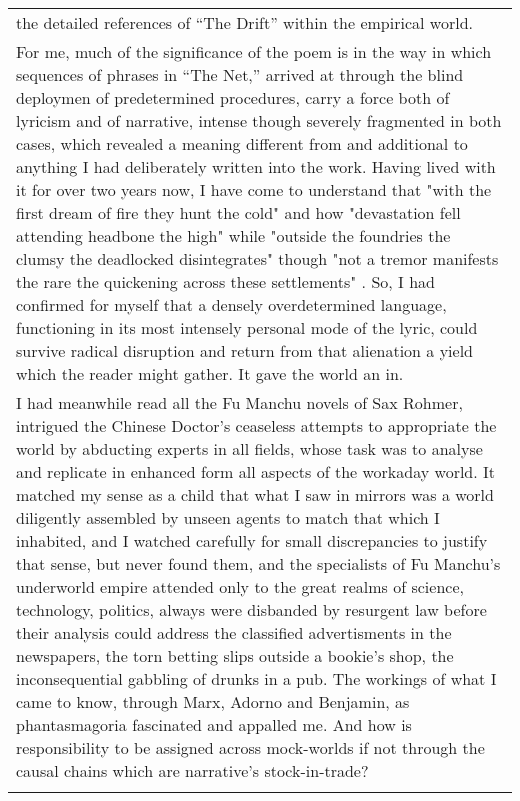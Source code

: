 \begin{longtable}[]{@{}l@{}}
\begin{minipage}[t]{0.97\columnwidth}
the detailed references of ``The Drift'' within the empirical
world.\strut
\end{minipage}\tabularnewline
\begin{minipage}[t]{0.97\columnwidth}\raggedright
For me, much of the significance of the poem is in the way in which
sequences of phrases in ``The Net,'' arrived at through the blind
deploymen of predetermined procedures, carry a force both of lyricism
and of narrative, intense though severely fragmented in both cases,
which revealed a meaning different from and additional to anything I had
deliberately written into the work. Having lived with it for over two
years now, I have come to understand that "with the first dream of fire
they hunt the cold" and how "devastation fell attending headbone the
high" while "outside the foundries the clumsy the deadlocked
disintegrates" though "not a tremor manifests the rare the quickening
across these settlements" . So, I had confirmed for myself that a
densely overdetermined language, functioning in its most intensely
personal mode of the lyric, could survive radical disruption and return
from that alienation a yield which the reader might gather. It gave the
world an in.\strut
\end{minipage}\tabularnewline
\begin{minipage}[t]{0.97\columnwidth}\raggedright
I had meanwhile read all the Fu Manchu novels of Sax Rohmer, intrigued
the Chinese Doctor's ceaseless attempts to appropriate the world by
abducting experts in all fields, whose task was to analyse and replicate
in enhanced form all aspects of the workaday world. It matched my sense
as a child that what I saw in mirrors was a world diligently assembled
by unseen agents to match that which I inhabited, and I watched
carefully for small discrepancies to justify that sense, but never found
them, and the specialists of Fu Manchu's underworld empire attended only
to the great realms of science, technology, politics, always were
disbanded by resurgent law before their analysis could address the
classified advertisments in the newspapers, the torn betting slips
outside a bookie's shop, the inconsequential gabbling of drunks in a
pub. The workings of what I came to know, through Marx, Adorno and
Benjamin, as phantasmagoria fascinated and appalled me. And how is
responsibility to be assigned across mock-worlds if not through the
causal chains which are narrative's stock-in-trade?\strut
\end{minipage}\tabularnewline
\begin{minipage}[t]{0.97\columnwidth}\raggedright

\end{minipage}
\end{longtable}
